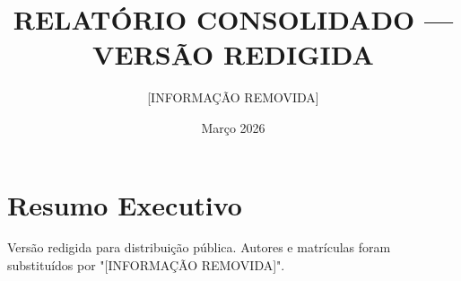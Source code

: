 \documentclass[12pt,a4paper,oneside]{article}
\begin{document}
\title{RELATÓRIO CONSOLIDADO — VERSÃO REDIGIDA}
\author{[INFORMAÇÃO REMOVIDA]}
\date{Março 2026}
\maketitle

\section*{Resumo Executivo}
Versão redigida para distribuição pública. Autores e matrículas foram substituídos por "[INFORMAÇÃO REMOVIDA]".

\end{document}
